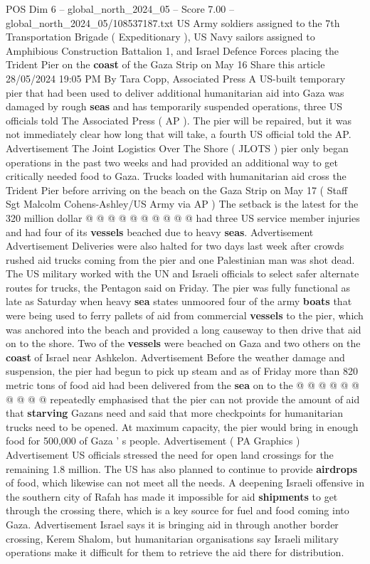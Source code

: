 \begin{textsample}{POS Dim 6 – global\_north\_2024\_05 – Score 7.00 – global\_north\_2024\_05/108537187.txt}  \label{ex:f6_pos_170}
US Army soldiers assigned to the 7th Transportation Brigade ( Expeditionary ), US Navy sailors assigned to Amphibious Construction Battalion 1, and Israel Defence Forces placing the Trident Pier on the \textbf{coast} of the Gaza Strip on May 16 Share this article 28/05/2024 19:05 PM By Tara Copp, Associated Press A US-built temporary pier that had been used to deliver additional humanitarian aid into Gaza was damaged by rough \textbf{seas} and has temporarily suspended operations, three US officials told The Associated Press ( AP ).
The pier will be repaired, but it was not immediately clear how long that will take, a fourth US official told the AP.
Advertisement The Joint Logistics Over The Shore ( JLOTS ) pier only began operations in the past two weeks and had provided an additional way to get critically needed food to Gaza.
Trucks loaded with humanitarian aid cross the Trident Pier before arriving on the beach on the Gaza Strip on May 17 ( Staff Sgt Malcolm Cohens-Ashley/US Army via AP ) The setback is the latest for the 320 million dollar @ @ @ @ @ @ @ @ @ @ had three US service member injuries and had four of its \textbf{vessels} beached due to heavy \textbf{seas}.
Advertisement Advertisement Deliveries were also halted for two days last week after crowds rushed aid trucks coming from the pier and one Palestinian man was shot dead.
The US military worked with the UN and Israeli officials to select safer alternate routes for trucks, the Pentagon said on Friday.
The pier was fully functional as late as Saturday when heavy \textbf{sea} states unmoored four of the army \textbf{boats} that were being used to ferry pallets of aid from commercial \textbf{vessels} to the pier, which was anchored into the beach and provided a long causeway to then drive that aid on to the shore.
Two of the \textbf{vessels} were beached on Gaza and two others on the \textbf{coast} of Israel near Ashkelon.
Advertisement Before the weather damage and suspension, the pier had begun to pick up steam and as of Friday more than 820 metric tons of food aid had been delivered from the \textbf{sea} on to the @ @ @ @ @ @ @ @ @ @ repeatedly emphasised that the pier can not provide the amount of aid that \textbf{starving} Gazans need and said that more checkpoints for humanitarian trucks need to be opened.
At maximum capacity, the pier would bring in enough food for 500,000 of Gaza ' s people.
Advertisement ( PA Graphics ) Advertisement US officials stressed the need for open land crossings for the remaining 1.8 million.
The US has also planned to continue to provide \textbf{airdrops} of food, which likewise can not meet all the needs.
A deepening Israeli offensive in the southern city of Rafah has made it impossible for aid \textbf{shipments} to get through the crossing there, which is a key source for fuel and food coming into Gaza.
Advertisement Israel says it is bringing aid in through another border crossing, Kerem Shalom, but humanitarian organisations say Israeli military operations make it difficult for them to retrieve the aid there for distribution.

\end{textsample}
